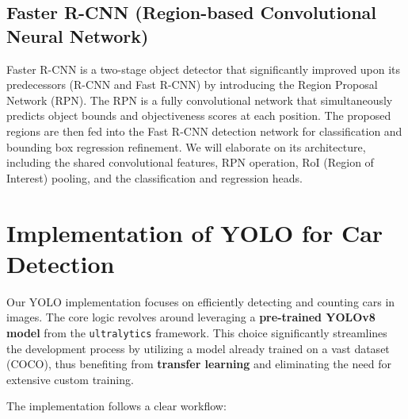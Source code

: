 \documentclass[12pt,a4paper]{article}
\begin{document}
\subsection{Faster R-CNN (Region-based Convolutional Neural Network)}
\label{ssec:fastrcnn_overview} 
Faster R-CNN is a two-stage object detector that significantly improved upon its predecessors (R-CNN and Fast R-CNN) by introducing the Region Proposal Network (RPN). The RPN is a fully convolutional network that simultaneously predicts object bounds and objectiveness scores at each position. The proposed regions are then fed into the Fast R-CNN detection network for classification and bounding box regression refinement. We will elaborate on its architecture, including the shared convolutional features, RPN operation, RoI (Region of Interest) pooling, and the classification and regression heads.


\section{Implementation of YOLO for Car Detection}
\label{sec:yolo_implementation}

Our YOLO implementation focuses on efficiently detecting and counting cars in images. The core logic revolves around leveraging a \textbf{pre-trained YOLOv8 model} from the \texttt{ultralytics} framework. This choice significantly streamlines the development process by utilizing a model already trained on a vast dataset (COCO), thus benefiting from \textbf{transfer learning} and eliminating the need for extensive custom training.

The implementation follows a clear workflow:
\end{document}
